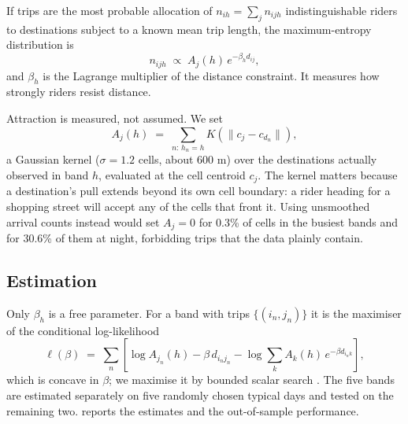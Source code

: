 If trips are the most probable
allocation of $n_{ih}=\sum_j n_{ijh}$ indistinguishable riders to destinations subject
to a known mean trip length, the maximum-entropy distribution is
\cite{wilson1970}
\begin{equation}
n_{ijh} \;\propto\; A_j(h)\,e^{-\beta_h d_{ij}},
\end{equation}
and $\beta_h$ is the Lagrange multiplier of the distance constraint. It measures how
strongly riders resist distance.

Attraction is measured, not assumed. We set
\begin{equation}
A_j(h) \;=\; \sum_{n:\,h_n=h} K\!\left(\|c_j-c_{d_n}\|\right),
\end{equation}
a Gaussian kernel ($\sigma=1.2$ cells, about 600 m) over the destinations actually
observed in band $h$, evaluated at the cell centroid $c_j$. The kernel matters because
a destination's pull extends beyond its own cell boundary: a rider heading for a
shopping street will accept any of the cells that front it. Using unsmoothed arrival
counts instead would set $A_j=0$ for 0.3\% of cells in the busiest bands and for 30.6\%
of them at night, forbidding trips that the data plainly contain.

\subsection{Estimation}

Only $\beta_h$ is a free parameter. For a band with trips $\{(i_n,j_n)\}$ it is the
maximiser of the conditional log-likelihood
\begin{equation}
\ell(\beta) \;=\; \sum_{n} \left[\log A_{j_n}(h) - \beta\, d_{i_n j_n}
 - \log \sum_k A_k(h)\,e^{-\beta d_{i_n k}}\right],
\label{eq:mle}
\end{equation}
which is concave in $\beta$; we maximise it by bounded scalar search
\cite{virtanen2020}. The five bands are estimated separately on five randomly chosen
typical days and tested on the remaining two.  reports the estimates and
the out-of-sample performance.

